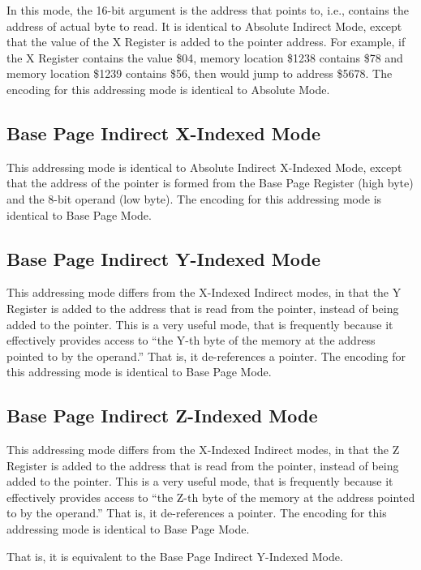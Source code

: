 In this mode, the 16-bit argument is the address that points to, i.e., contains the
address of actual byte to read. It is identical to Absolute Indirect Mode, except that
 the value of the X Register is added to the pointer address. 
For example, if the X Register contains the value \$04, memory location \$1238 contains \$78
and memory location \$1239 contains \$56, then  would jump
to address \$5678.
The encoding for this addressing mode is identical to Absolute Mode.

\subsection{Base Page Indirect X-Indexed Mode}

This addressing mode is identical to Absolute Indirect X-Indexed Mode, except that the address
of the pointer is formed from the Base Page Register (high byte) and the 8-bit operand (low byte).
The encoding for this addressing mode is identical to Base Page Mode.

\subsection{Base Page Indirect Y-Indexed Mode}

This addressing mode differs from the X-Indexed Indirect modes, in that the Y Register is
added to the address that is read from the pointer, instead of being added to the pointer.
This is a very useful mode, that is frequently because it effectively provides access to
``the Y-th byte of the memory at the address pointed to by the operand.'' That is, it de-references
a pointer.
The encoding for this addressing mode is identical to Base Page Mode.

\subsection{Base Page Indirect Z-Indexed Mode}

This addressing mode differs from the X-Indexed Indirect modes, in that the Z Register is
added to the address that is read from the pointer, instead of being added to the pointer.
This is a very useful mode, that is frequently because it effectively provides access to
``the Z-th byte of the memory at the address pointed to by the operand.'' That is, it de-references
a pointer. 
The encoding for this addressing mode is identical to Base Page Mode.

That is, it is equivalent to the Base Page Indirect Y-Indexed Mode.

